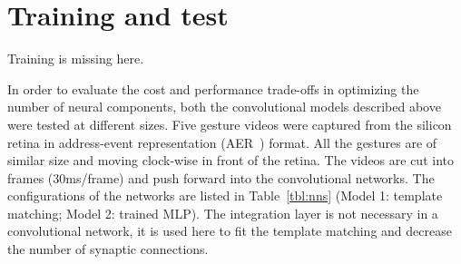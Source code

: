 \section{Training and test}
\label{sec:tat}

Training is missing here.

In order to evaluate the cost and performance trade-offs in optimizing the number of neural components, both the convolutional models described above were tested at different sizes. 
Five gesture videos were captured from the silicon retina in address-event representation (AER~\cite{lazzaro1995multi}) format.  
All the gestures are of similar size and moving clock-wise in front of the retina. 
The videos are cut into frames (30ms/frame) and push forward into the convolutional networks. 
The configurations of the networks are listed in Table~\ref{tbl:nns} (Model 1: template matching; Model 2: trained MLP). 
The integration layer is not necessary in a convolutional network, it is used here to fit the template matching and decrease the number of synaptic connections.

